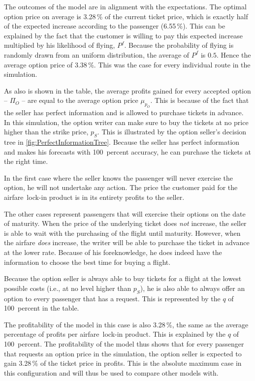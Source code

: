 The outcomes of the model are in alignment with the expectations. The optimal option price on average is 3.28\,\% of the current ticket price, which is exactly half of the expected increase according to the passenger (6.55\,\%). This can be explained by the fact that the customer is willing to pay this expected increase multiplied by his likelihood of flying, $P^f$. Because the probability of flying is randomly drawn from an uniform distribution, the average of $P^f$ is $0.5$. Hence the average option price of 3.38\,\%. This was the case for every individual route in the simulation.

As also is shown in the table, the average profits gained for every accepted option -- $\Pi_O$ -- are equal to the average option price $\mu_{p_O}$. This is because of the fact that the seller has perfect information and is allowed to purchase tickets in advance. In this simulation, the option writer can make sure to buy the tickets at no price higher than the strike price, $p_S$. This is illustrated by the option seller's decision tree in \autoref{fig:PerfectInformationTree}. Because the seller has perfect information and makes his forecasts with 100~percent accuracy, he can purchase the tickets at the right time.

In the first case where the seller knows the passenger will never exercise the option, he will not undertake any action. The price the customer paid for the airfare~lock-in product is in its entirety profits to the seller.

The other cases represent passengers that will exercise their options on the date of maturity. When the price of the underlying ticket does \emph{not} increase, the seller is able to wait with the purchasing of the flight until maturity. However, when the airfare \emph{does} increase, the writer will be able to purchase the ticket in advance at the lower rate. Because of his foreknowledge, he does indeed have the information to choose the best time for buying a flight.


Because the option seller is always able to buy tickets for a flight at the lowest possible costs (i.e., at no level higher than $p_S$), he is also able to always offer an option to every passenger that has a request. This is represented by the $q$ of 100~percent in the table.

The profitability of the model in this case is also 3.28\,\%, the same as the average percentage of profits per airfare~lock-in product. This is explained by the $q$ of 100~percent. The profitability of the model thus shows that for every passenger that requests an option price in the simulation, the option seller is expected to gain 3.28\,\% of the ticket price in profits. This is the absolute maximum case in this configuration and will thus be used to compare other models with. 


